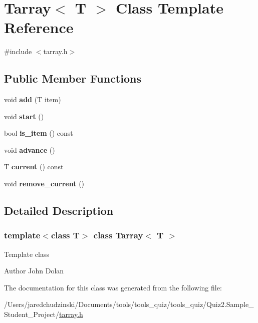 \hypertarget{class_tarray}{}\section{Tarray$<$ T $>$ Class Template Reference}
\label{class_tarray}


{\ttfamily \#include $<$tarray.\+h$>$}

\subsection*{Public Member Functions}
\begin{DoxyCompactItemize}
\item 
\mbox{\label{class_tarray_a973a89fb0a3fe40c1680f6cae63981ad}} 
void {\bfseries add} (T item)
\item 
\mbox{\label{class_tarray_afdf48d2a03b6b1c110818998b6a86a38}} 
void {\bfseries start} ()
\item 
\mbox{\label{class_tarray_ab4047d306cc681cee5b665f0cca887f1}} 
bool {\bfseries is\+\_\+item} () const
\item 
\mbox{\label{class_tarray_a5bd5dd08f5bfe1c2a5dab59ad7896ecf}} 
void {\bfseries advance} ()
\item 
\mbox{\label{class_tarray_a60bc796c7843e2edaae82d42c15c4360}} 
T {\bfseries current} () const
\item 
\mbox{\label{class_tarray_af1728e8ed47a8de0fd3eedfa526b0c43}} 
void {\bfseries remove\+\_\+current} ()
\end{DoxyCompactItemize}


\subsection{Detailed Description}
\subsubsection*{template$<$class T$>$\newline
class Tarray$<$ T $>$}

Template class \begin{DoxyAuthor}{Author}
John Dolan 
\end{DoxyAuthor}


The documentation for this class was generated from the following file\+:\begin{DoxyCompactItemize}
\item 
/\+Users/jaredchudzinski/\+Documents/tools/tools\+\_\+quiz/tools\+\_\+quiz/\+Quiz2.\+Sample\+\_\+\+Student\+\_\+\+Project/\mbox{\hyperlink{tarray_8h}{tarray.\+h}}\end{DoxyCompactItemize}
